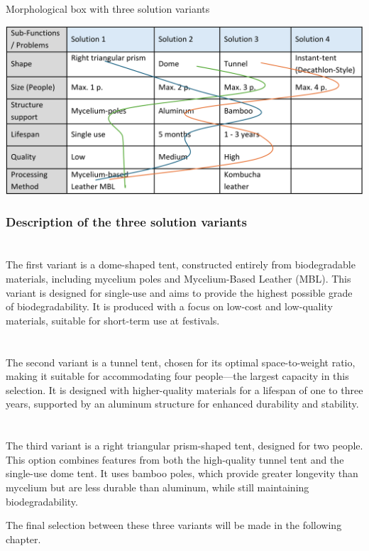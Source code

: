 \documentclass{article}
\newcommand{\pph}[1]{\paragraph{#1} \phantom{}\\}
\begin{document}
\begin{table}[ht!]
    \centering
    \caption{Morphological box with three solution variants}
    \includegraphics[width=.85\textwidth]{media/morph_box.png}
    \label{tab:morph_box}
\end{table}

\subsubsection{Description of the three solution variants}
\pph{\color{newgreen}{Variant 1: Dome tent (Single use, Fully biodegradable)}}
The first variant is a dome-shaped tent, constructed entirely from biodegradable materials,
including mycelium poles and Mycelium-Based Leather (MBL). This variant is designed for
single-use and aims to provide the highest possible grade of biodegradability. It is produced
with a focus on low-cost and low-quality materials, suitable for short-term use at festivals.

\pph{\color{neworange}{Variant 2: Tunner tent (Four-person, Long-lasting)}}
The second variant is a tunnel tent, chosen for its optimal space-to-weight ratio, making it
suitable for accommodating four people—the largest capacity in this selection. It is designed
with higher-quality materials for a lifespan of one to three years, supported by an aluminum
structure for enhanced durability and stability.

\pph{\color{newblue}{Variant 3: Triangular prism tent (Two-person, Medium-lasting)}}
The third variant is a right triangular prism-shaped tent, designed for two people. This option
combines features from both the high-quality tunnel tent and the single-use dome tent. It
uses bamboo poles, which provide greater longevity than mycelium but are less durable
than aluminum, while still maintaining biodegradability.

The final selection between these three variants will be made in the following chapter.
\end{document}
